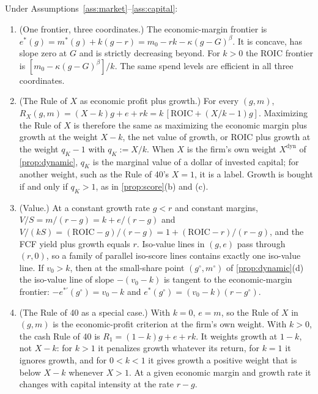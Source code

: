 \begin{remark}\label{prop:general}
Under Assumptions~\ref{ass:market}--\ref{ass:capital}:
\begin{enumerate}
\item[(a)] (One frontier, three coordinates.) The economic-margin frontier is $e^*(g)=m^*(g)+k(g-r)=m_0-rk-\kappa(g-G)^{\beta}$. It is concave, has slope zero at $G$ and is strictly decreasing beyond. For $k>0$ the ROIC frontier is $[m_0-\kappa(g-G)^{\beta}]/k$. The same spend levels are efficient in all three coordinates.
\item[(b)] (The Rule of $X$ as economic profit plus growth.) For every $(g,m)$, $R_X(g,m)=(X-k)g+e+rk=k\,[\mathrm{ROIC}+(X/k-1)g]$. Maximizing the Rule of $X$ is therefore the same as maximizing the economic margin plus growth at the weight $X-k$, the net value of growth, or ROIC plus growth at the weight $q_K-1$ with $q_K:=X/k$. When $X$ is the firm's own weight $X^{\mathrm{dyn}}$ of \autoref{prop:dynamic}, $q_K$ is the marginal value of a dollar of invested capital; for another weight, such as the Rule of 40's $X=1$, it is a label. Growth is bought if and only if $q_K>1$, as in \autoref{prop:score}(b) and (c).
\item[(c)] (Value.) At a constant growth rate $g<r$ and constant margins, $V/S=m/(r-g)=k+e/(r-g)$ and $V/(kS)=(\mathrm{ROIC}-g)/(r-g)=1+(\mathrm{ROIC}-r)/(r-g)$, and the FCF yield plus growth equals $r$. Iso-value lines in $(g,e)$ pass through $(r,0)$, so a family of parallel iso-score lines contains exactly one iso-value line. If $v_0>k$, then at the small-share point $(g^\circ,m^\circ)$ of \autoref{prop:dynamic}(d) the iso-value line of slope $-(v_0-k)$ is tangent to the economic-margin frontier: $-e^{*\prime}(g^\circ)=v_0-k$ and $e^*(g^\circ)=(v_0-k)(r-g^\circ)$.
\item[(d)] (The Rule of 40 as a special case.) With $k=0$, $e=m$, so the Rule of $X$ in $(g,m)$ is the economic-profit criterion at the firm's own weight. With $k>0$, the cash Rule of 40 is $R_1=(1-k)g+e+rk$. It weights growth at $1-k$, not $X-k$: for $k>1$ it penalizes growth whatever its return, for $k=1$ it ignores growth, and for $0<k<1$ it gives growth a positive weight that is below $X-k$ whenever $X>1$. At a given economic margin and growth rate it changes with capital intensity at the rate $r-g$.
\end{enumerate}
\end{remark}


